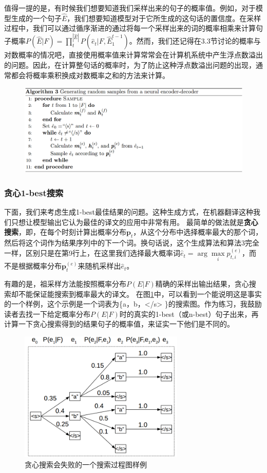 \documentclass[10pt,a4paper]{ctexart}
\begin{document}
值得一提的是，有时候我们想要知道我们采样出来的句子的概率值。例如，对于模型生成的一个句子$\hat{E}$，我们想要知道模型对于它所生成的这句话的置信度。在采样过程中，我们可以通过循序渐进的通过将每一个采样出来的词的概率相乘来计算句子概率$P(\hat{E}|F) = \prod_{t}^{|\hat{E}|}P(\hat{e}_t|F,\hat{E}_1^{t-1})$。然而，我们还记得在3.3节讨论的概率与对数概率的情况吧，直接使用概率值来计算常常会在计算机系统中产生浮点数溢出的问题。因此，在计算整句话的概率时，为了防止这种浮点数溢出问题的出现，通常都会将概率乘积换成对数概率之和的方法来计算。

\begin{figure}[H]
\centering
\includegraphics[width=1\textwidth]{alg3.png}
\end{figure}

\subsubsection{贪心1-best搜索}
下面，我们来考虑生成1-best最佳结果的问题。这种生成方式，在机器翻译这种我们只想让模型输出它认为最佳的译文的应用中非常有用。
最简单的做法就是\textbf{贪心搜索}，即，在每个时刻计算出概率分布$\textbf{p}_t$，从这个分布中选择概率最大的那个词，然后将这个词作为结果序列中的下一个词。换句话说，这个生成算法和算法3完全一样，区别只是在第9行上，在这里我们选择最大概率词$\hat{e}_t = \arg \max \limits_{i} p_{t,i}^{(e)}$，而不是根据概率分布$\textbf{p}_t^{(e)}$来随机采样出$\hat{e}_t$。

有趣的是，祖采样方法能按照概率分布$P(E|F)$精确的采样出输出结果，贪心搜索却不能保证能搜索到概率最大的译文。
在图\ref{fig:22}中，可以看到一个能说明这是事实的一个样例，这个示例是一个词表为\{a，b，</s> \}的搜索图。作为练习，我鼓励读者去找一下给定概率分布$P(E|F)$时的真实的1-best（或n-best）句子出来，再计算一下贪心搜索得到的结果句子的概率值，来证实一下他们是不同的。

\begin{figure}[H]
\centering
\includegraphics[width=0.7\textwidth]{fig22.png}
\caption{贪心搜索会失败的一个搜索过程图样例}
\label{fig:22}
\end{figure}
\end{document}
